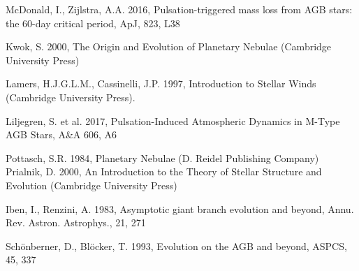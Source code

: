 \documentclass[a4paper,12pt]{article}
\begin{document}
\begin{thebibliography}{9}
    McDonald, I., Zijlstra, A.A. 2016, Pulsation-triggered mass loss from AGB stars: the 60-day critical period, ApJ, 823, L38 




    Kwok, S. 2000, The Origin and Evolution of Planetary Nebulae (Cambridge University Press)


    Lamers, H.J.G.L.M., Cassinelli, J.P. 1997, Introduction to Stellar Winds (Cambridge University Press). 

    Liljegren, S. et al. 2017, Pulsation-Induced Atmospheric Dynamics in M-Type AGB Stars, A\&A 606, A6 


    Pottasch, S.R. 1984, Planetary Nebulae (D. Reidel Publishing Company) \\

    Prialnik, D. 2000, An Introduction to the Theory of Stellar Structure and Evolution (Cambridge University Press)

    Iben, I., Renzini, A. 1983, Asymptotic giant branch evolution and beyond, Annu. Rev. Astron. Astrophys., 21, 271

    Schönberner, D., Blöcker, T. 1993, Evolution on the AGB and beyond, ASPCS, 45, 337




\end{thebibliography}
\end{document}
